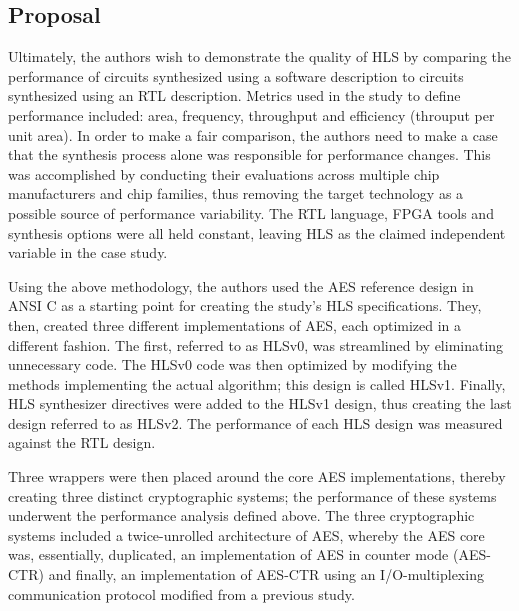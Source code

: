 \documentclass[onecolumn]{article}
\begin{document}
\subsection{Proposal}

Ultimately, the authors wish to demonstrate the quality of HLS by comparing the performance of circuits synthesized using a software description to circuits synthesized using an RTL description. Metrics used in the study to define performance included: area, frequency, throughput and efficiency (throuput per unit area). In order to make a fair comparison, the authors need to make a case that the synthesis process alone was responsible for performance changes. This was accomplished by conducting their evaluations across multiple chip manufacturers and chip families, thus removing the target technology as a possible source of performance variability. The RTL language, FPGA tools and synthesis options were all held constant, leaving HLS as the claimed independent variable in the case study. 

Using the above methodology, the authors used the AES reference design in ANSI C \cite{17} as a starting point for creating the study's HLS specifications. They, then, created three different implementations of AES, each optimized in a different fashion. The first, referred to as HLSv0, was streamlined by eliminating unnecessary code. The HLSv0 code was then optimized by modifying the methods implementing the actual algorithm; this design is called HLSv1. Finally, HLS synthesizer directives were added to the HLSv1 design, thus creating the last design referred to as HLSv2. The performance of each HLS design was measured against the RTL design.

Three wrappers were then placed around the core AES implementations, thereby creating three distinct cryptographic systems; the performance of these systems underwent the performance analysis defined above. The three cryptographic systems included a twice-unrolled architecture of AES, whereby the AES core was, essentially, duplicated, an implementation of AES in counter mode (AES-CTR) and finally, an implementation of AES-CTR using an I/O-multiplexing communication protocol modified from a previous study\cite{20}.

\end{document}
